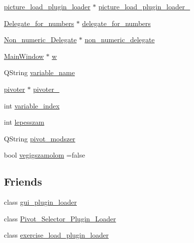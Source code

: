 \begin{DoxyCompactItemize}
\item 
\hyperlink{classpicture__load__plugin__loader}{picture\+\_\+load\+\_\+plugin\+\_\+loader} $\ast$ \hyperlink{classSimplex__method__calculator_aa08d5d3af46371e2f284787d812cc13d}{picture\+\_\+load\+\_\+plugin\+\_\+loader\+\_\+}
\item 
\hyperlink{classDelegate__for__numbers}{Delegate\+\_\+for\+\_\+numbers} $\ast$ \hyperlink{classSimplex__method__calculator_af2cc4c4cdfd39757c6dc2214bccdd304}{delegate\+\_\+for\+\_\+numbers}
\item 
\hyperlink{classNon__numeric__Delegate}{Non\+\_\+numeric\+\_\+\+Delegate} $\ast$ \hyperlink{classSimplex__method__calculator_a96ae2b3ac3eb65dba75b64e9b9224de6}{non\+\_\+numeric\+\_\+delegate}
\item 
\hyperlink{classMainWindow}{Main\+Window} $\ast$ \hyperlink{classSimplex__method__calculator_ac37e43d93e0b32219606ece1b8fa82f9}{w}
\item 
Q\+String \hyperlink{classSimplex__method__calculator_ab223955f9cf2afc3a32ff6bd13a3f5a4}{variable\+\_\+name}
\item 
\hyperlink{classpivoter}{pivoter} $\ast$ \hyperlink{classSimplex__method__calculator_af0c3d43b92c27818898e683f011c3551}{pivoter\+\_\+}
\item 
int \hyperlink{classSimplex__method__calculator_a74047e24272272857106e1598c275b7c}{variable\+\_\+index}
\item 
int \hyperlink{classSimplex__method__calculator_a7ea9c59977f472e59f4a796a1d6adc3d}{lepesszam}
\item 
Q\+String \hyperlink{classSimplex__method__calculator_a842364a5813bbc932781f059dd948fd0}{pivot\+\_\+modszer}
\item 
bool \hyperlink{classSimplex__method__calculator_a387257570c09a5459a9edfe37d9dd002}{vegigszamolom} =false
\end{DoxyCompactItemize}
\subsection*{Friends}
\begin{DoxyCompactItemize}
\item 
class \hyperlink{classSimplex__method__calculator_a9762517abc1c30aa1289cf8dc2560b3d}{gui\+\_\+plugin\+\_\+loader}
\item 
class \hyperlink{classSimplex__method__calculator_a6ea4c13e2ee3a46ce7f59f0baaf4feca}{Pivot\+\_\+\+Selector\+\_\+\+Plugin\+\_\+\+Loader}
\item 
class \hyperlink{classSimplex__method__calculator_a2ae02a3574508e653447a544639a0fe0}{exercise\+\_\+load\+\_\+plugin\+\_\+loader}
\end{DoxyCompactItemize}


